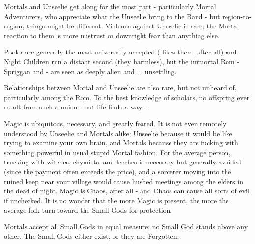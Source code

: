   Mortals and Unseelie get along for the most part - particularly Mortal Adventurers, who appreciate what the Unseelie bring to the Band - but region-to-region, things might be different.  Violence against Unseelie is  rare; the Mortal reaction to them is more mistrust or downright fear than anything else.


Pooka are generally the most universally accepted ( likes them, after all) and Night Children run a distant second (they  harmless), but the immortal Rom - Spriggan and \Murk - are seen as deeply alien and ... unsettling.

Relationships between Mortal and Unseelie are also rare, but not unheard of, particularly among the Rom.  To the best knowledge of scholars, no offspring ever result from such a union - but life finds a way ...

  
  Magic is ubiquitous, necessary, and greatly feared.  It is not even remotely understood by Unseelie and Mortals alike; Unseelie because it would be like trying to examine your own brain, and Mortals because they are fucking with something powerful in usual stupid Mortal fashion.  For the average person, trucking with witches, chymists, and leeches is necessary but generally avoided (since the payment often exceeds the price), and a sorcerer moving into the ruined keep near your village would cause hushed meetings among the elders in the dead of night.  Magic is Chaos, after all - and Chaos can cause all sorts of evil if unchecked.  It is no wonder that the more Magic is present, the more the average folk turn toward the Small Gods for protection.



  Mortals accept all Small Gods in equal measure; no Small God stands above any other.  The Small Gods either exist, or they are Forgotten.

